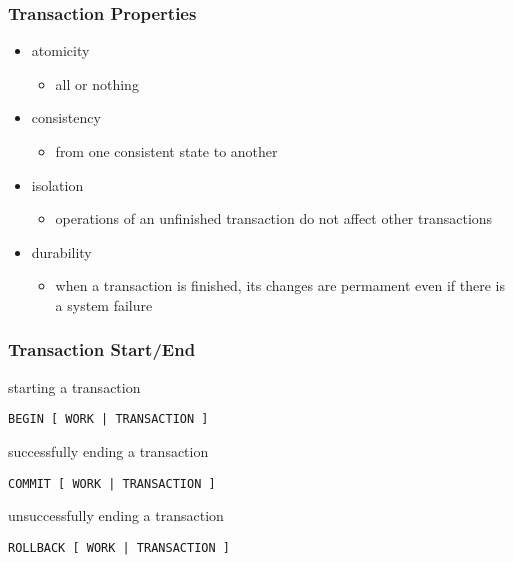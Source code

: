 \documentclass[dvipsnames]{beamer}
\theoremstyle{plain}
\begin{document}
\begin{frame}
  \frametitle{Transaction Properties}

  \begin{itemize}
    \item atomicity
    \begin{itemize}
      \item all or nothing
    \end{itemize}

    \pause
    \item consistency
    \begin{itemize}
      \item from one consistent state to another
    \end{itemize}

    \pause
    \item isolation
    \begin{itemize}
      \item operations of an unfinished transaction do not affect other
        transactions
    \end{itemize}

    \pause
    \item durability
    \begin{itemize}
      \item when a transaction is finished, its changes are permament even if
        there is a system failure
    \end{itemize}
  \end{itemize}
\end{frame}

\begin{frame}[fragile]
  \frametitle{Transaction Start/End}

  \begin{block}{starting a transaction}
    \begin{lstlisting}
BEGIN [ WORK | TRANSACTION ]
    \end{lstlisting}
  \end{block}

  \pause
  \begin{block}{successfully ending a transaction}
    \begin{lstlisting}
COMMIT [ WORK | TRANSACTION ]
    \end{lstlisting}
  \end{block}

  \pause
  \begin{block}{unsuccessfully ending a transaction}
    \begin{lstlisting}
ROLLBACK [ WORK | TRANSACTION ]
    \end{lstlisting}
  \end{block}
\end{frame}
\end{document}
